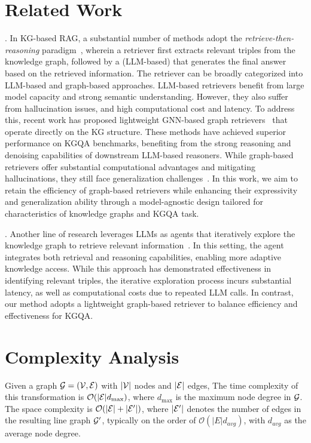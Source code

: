 \section{Related Work}
\label{related_work}
.
In KG-based RAG, a substantial number of methods adopt the \textit{retrieve-then-reasoning} paradigm~\cite{li2023graph,kim-etal-2023-kg,liu2025dualreasoninggnnllmcollaborative,wu2023retrieverewriteanswerkgtotextenhancedllms,wen2023mindmap,mavromatis2024gnn,li2024simple,luo2024rog,mavromatis2022rearev}, wherein a retriever first extracts relevant triples from the knowledge graph, followed by a (LLM-based) that generates the final answer based on the retrieved information. The retriever can be broadly categorized into LLM-based and graph-based approaches.
LLM-based retrievers benefit from large model capacity and strong semantic understanding. However, they also suffer from hallucination issues, and high computational cost and latency. To address this, recent work has proposed lightweight GNN-based graph retrievers~\cite{mavromatis2022rearev,li2024simple,zhang2022subgraph,mavromatis2022rearev} that operate directly on the KG structure. These methods have achieved superior performance on KGQA benchmarks, benefiting from the strong reasoning and denoising capabilities of downstream LLM-based reasoners. While graph-based retrievers offer substantial computational advantages and mitigating hallucinations, they still face generalization challenges~\cite{li2024simple}. In this work, we aim to retain the efficiency of graph-based retrievers while  enhancing their expressivity and generalization ability through a model-agnostic design tailored for characteristics of knowledge graphs and KGQA task.

. 
Another line of research leverages LLMs as agents that iteratively explore the knowledge graph to retrieve relevant information~\cite{gao2024two,wang2024knowledge,jiang2024kg,sunthink,chen2024plan,ma2024think,jin2024graph}. In this setting, the agent integrates both retrieval and reasoning capabilities, enabling more adaptive knowledge access. While this approach has demonstrated effectiveness in identifying relevant triples, the iterative exploration process incurs substantial latency, as well as computational costs due to repeated LLM calls. In contrast, our method adopts a lightweight graph-based retriever to balance efficiency and effectiveness for KGQA.

\section{Complexity Analysis}
\label{app:complexity}
 Given a graph $\mathcal{G} = (\mathcal{V}, \mathcal{E})$ with $|\mathcal{V}|$ nodes and $|\mathcal{E}|$ edges,  The time complexity of this transformation is $\mathcal{O}(|\mathcal{E}| d_{\max})$, where $d_{\max}$ is the maximum node degree in $\mathcal{G}$. The space complexity is $\mathcal{O}(|\mathcal{E}| + |\mathcal{E}'|)$, where $|\mathcal{E}'|$ denotes the number of edges in the resulting line graph $\mathcal{G}'$, typically on the order of $\mathcal{O}(|E| d_{avg})$, with $d_{avg}$ as the average node degree.

